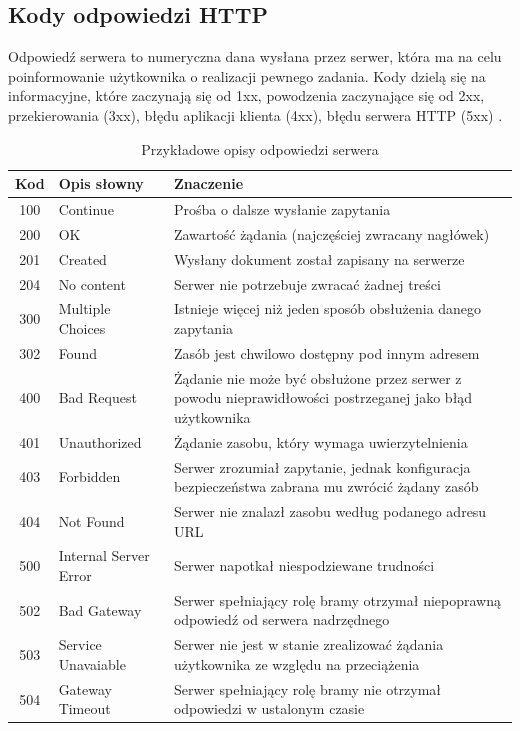 \subsection*{Kody odpowiedzi HTTP}
Odpowiedź serwera to numeryczna dana wysłana przez serwer, która ma na celu poinformowanie użytkownika o realizacji pewnego zadania. Kody dzielą się na informacyjne, które zaczynają się od 1xx, powodzenia zaczynające się od 2xx, przekierowania (3xx), błędu aplikacji klienta (4xx), błędu serwera HTTP (5xx) \cite{TempWiki}.
\begin{longtable}{|c|p{2cm}|p{10cm}|}
	\caption{Przykładowe opisy odpowiedzi serwera} 
	\label{tab:Kody-HTTP} \\
	\hline
	\textbf{Kod} & \textbf{Opis słowny} & \textbf{Znaczenie} \\ \hline
	100 & Continue & Prośba o dalsze wysłanie zapytania \\ \hline
	200 & OK & Zawartość żądania (najczęściej zwracany nagłówek)\\ \hline
	201 & Created & Wysłany dokument został zapisany na serwerze \\ \hline
	204 & No content & Serwer nie potrzebuje zwracać żadnej treści \\ \hline
	300 & Multiple Choices & Istnieje więcej niż jeden sposób obsłużenia danego zapytania \\ \hline
	302 & Found & Zasób jest chwilowo dostępny pod innym adresem \\ \hline
	400 & Bad Request & Żądanie nie może być obsłużone przez serwer z powodu nieprawidłowości postrzeganej jako błąd użytkownika \\ \hline
	401 & Unauthorized & Żądanie zasobu, który wymaga uwierzytelnienia \\ \hline
	403 & Forbidden & Serwer zrozumiał zapytanie, jednak konfiguracja bezpieczeństwa zabrana mu zwrócić żądany zasób \\ \hline
	404 & Not Found & Serwer nie znalazł zasobu według podanego adresu URL\\ \hline
	500 & Internal Server Error & Serwer napotkał niespodziewane trudności \\ \hline
	502 & Bad Gateway & Serwer spełniający rolę bramy otrzymał niepoprawną odpowiedź od serwera nadrzędnego \\ \hline
	503 & Service Unavaiable & Serwer nie jest w stanie zrealizować żądania użytkownika ze względu na przeciążenia \\ \hline
	504 & Gateway Timeout & Serwer spełniający rolę bramy nie otrzymał odpowiedzi w ustalonym czasie \\ \hline
\end{longtable}


